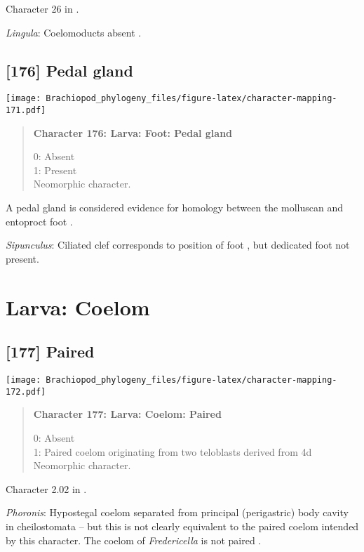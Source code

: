 \documentclass[openany]{book}
\theoremstyle{definition}
\theoremstyle{definition}
\theoremstyle{definition}
\theoremstyle{remark}
\begin{document}
Character 26 in \citet{Haszprunar2000}.

\hypertarget{Lingula-coding-175}{}
\emph{Lingula}: Coelomoducts absent \citep{Haszprunar2000}.

\subsection*{{[}176{]} Pedal gland}\label{pedal-gland}

\texttt{[image: Brachiopod\_phylogeny\_files/figure-latex/character-mapping-171.pdf]}

\begin{quote}
\textbf{Character 176: Larva: Foot: Pedal gland}

0: Absent\\
1: Present\\
Neomorphic character.
\end{quote}

A pedal gland is considered evidence for homology between the molluscan
and entoproct foot \citep{Haszprunar2008}.

\hypertarget{Sipunculus-coding-176}{}
\emph{Sipunculus}: Ciliated clef corresponds to position of foot
\citep{Reed1982}, but dedicated foot not present.

\section{Larva: Coelom}\label{larva-coelom}

\subsection*{{[}177{]} Paired}\label{paired}

\texttt{[image: Brachiopod\_phylogeny\_files/figure-latex/character-mapping-172.pdf]}

\begin{quote}
\textbf{Character 177: Larva: Coelom: Paired}

0: Absent\\
1: Paired coelom originating from two teloblasts derived from 4d\\
Neomorphic character.
\end{quote}

Character 2.02 in \citet{Scheltema1993}.

\hypertarget{Phoronis-coding-177}{}
\emph{Phoronis}: Hypostegal coelom separated from principal
(perigastric) body cavity in cheilostomata -- but this is not clearly
equivalent to the paired coelom intended by this character. The coelom
of \emph{Fredericella} is not paired \citep{Gruhl2010F}.
\end{document}
